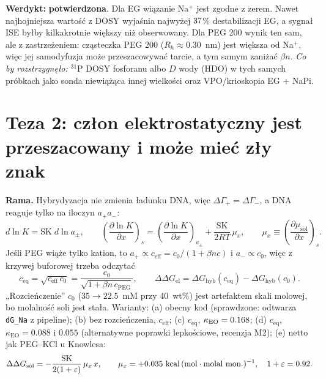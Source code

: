 \documentclass[10pt,a4paper]{article}
\newcommand{\apm}{a_{\pm}}
\newcommand{\verdict}[2]{\par\smallskip\noindent\colorbox{#1!12}{\parbox{\dimexpr\linewidth-2\fboxsep}{\textbf{Werdykt:} #2}}\par\smallskip}
\begin{document}
\verdict{green}{\textbf{potwierdzona}. Dla EG wiązanie Na$^+$ jest zgodne z zerem. Nawet najhojniejsza wartość z DOSY wyjaśnia najwyżej $37$\% destabilizacji EG, a sygnał ISE byłby kilkakrotnie większy niż obserwowany. Dla PEG 200 wynik ten sam, ale z zastrzeżeniem: cząsteczka PEG 200 ($R_h\approx0.30$~nm) jest większa od Na$^+$, więc jej samodyfuzja może przeszacowywać tarcie, a tym samym zaniżać $\beta n$. \textit{Co by rozstrzygnęło:} $^{31}$P DOSY fosforanu albo $D$ wody (HDO) w tych samych próbkach jako sonda niewiążąca innej wielkości oraz VPO/krioskopia EG + NaPi.}

\section{Teza 2: człon elektrostatyczny jest przeszacowany i może mieć zły znak}

\textbf{Rama.} Hybrydyzacja nie zmienia ładunku DNA, więc $\Delta\Gamma_+=\Delta\Gamma_-$, a DNA reaguje tylko na iloczyn $a_+a_-$:
\begin{equation}
d\ln K=\mathrm{SK}\;d\ln\apm,\qquad
\left(\frac{\partial\ln K}{\partial x}\right)_{\!s}=\left(\frac{\partial\ln K}{\partial x}\right)_{\!\apm}+\frac{\mathrm{SK}}{2RT}\,\mu_x,\qquad \mu_x\equiv\left(\frac{\partial\mu_\mathrm{s\acute{o}l}}{\partial x}\right)_{\!s}.
\end{equation}
Jeśli PEG wiąże tylko kation, to $a_+\propto c_\mathrm{eff}=c_0/(1+\beta n c)$ i $a_-\propto c_0$, więc z krzywej buforowej trzeba odczytać
\begin{equation}
c_\mathrm{eq}=\sqrt{c_\mathrm{eff}\,c_0}=\frac{c_0}{\sqrt{1+\beta n\,c_\mathrm{PEG}}},\qquad \Delta\Delta G_\mathrm{el}=\Delta G_\mathrm{hyb}(c_\mathrm{eq})-\Delta G_\mathrm{hyb}(c_0).
\end{equation}
„Rozcieńczenie” $c_0$ ($35\to22.5$~mM przy 40~wt\%) jest artefaktem skali molowej, bo molalność soli jest stała. Warianty: (a) obecny kod (sprawdzone: odtwarza \texttt{dG\_Na} z pipeline); (b) bez rozcieńczenia, $c_\mathrm{eff}$; (c) $c_\mathrm{eq}$, $\kappa_\mathrm{EO}=0.168$; (d) $c_\mathrm{eq}$, $\kappa_\mathrm{EO}=0.088$ i $0.055$ (alternatywne poprawki lepkościowe, recenzja M2); (e) netto jak PEG--KCl u Knowlesa:
\begin{equation}
\Delta\Delta G_\mathrm{s\acute{o}l}=-\frac{\mathrm{SK}}{2(1+\varepsilon)}\,\mu_x\,x,\qquad \mu_x=+0.035~\mathrm{kcal\,(mol\cdot molal\ mon.)^{-1}},\quad 1+\varepsilon=0.92.
\end{equation}
\end{document}
